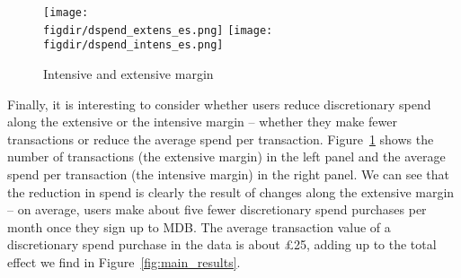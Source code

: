 \begin{figure}[h]
    \centering
    \caption{Intensive and extensive margin}%
    \label{fig:int_ext_results}
    \texttt{[image: \\figdir/dspend\_extens\_es.png]}
    \texttt{[image: \\figdir/dspend\_intens\_es.png]}
\end{figure}

Finally, it is interesting to consider whether users reduce discretionary spend
along the extensive or the intensive margin -- whether they make fewer
transactions or reduce the average spend per transaction.
Figure~\ref{fig:int_ext_results} shows the number of transactions (the
extensive margin) in the left panel and the average spend per transaction (the
intensive margin) in the right panel. We can see that the reduction in spend is
clearly the result of changes along the extensive margin -- on average, users
make about five fewer discretionary spend purchases per month once they sign up
to MDB. The average transaction value of a discretionary spend purchase in the
data is about \pounds25, adding up to the total effect we find in
Figure~\ref{fig:main_results}.

